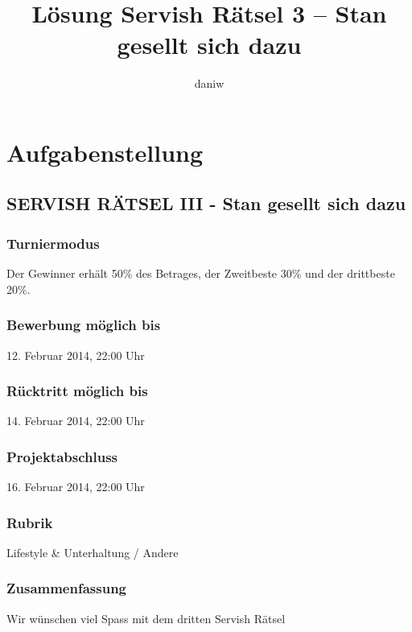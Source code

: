 \documentclass[a4paper, 10pt, fleqn]{article}
\title{Lösung Servish Rätsel 3 -- Stan gesellt sich dazu}
\author{daniw}
\begin{document}
\maketitle
\newpage
\tableofcontents
\newpage

\section{Aufgabenstellung}

\subsection*{SERVISH RÄTSEL III - Stan gesellt sich dazu}

\subsubsection*{Turniermodus}
Der Gewinner erhält 50\% des Betrages, der Zweitbeste 30\% und der drittbeste 20\%. 

\subsubsection*{Bewerbung möglich bis}
12. Februar 2014, 
22:00 Uhr 

\subsubsection*{Rücktritt möglich bis}
14. Februar 2014, 
22:00 Uhr 

\subsubsection*{Projektabschluss}
16. Februar 2014, 
22:00 Uhr 

\subsubsection*{Rubrik}
Lifestyle \& Unterhaltung / Andere

\subsubsection*{Zusammenfassung}
Wir wünschen viel Spass mit dem dritten Servish Rätsel
\end{document}
